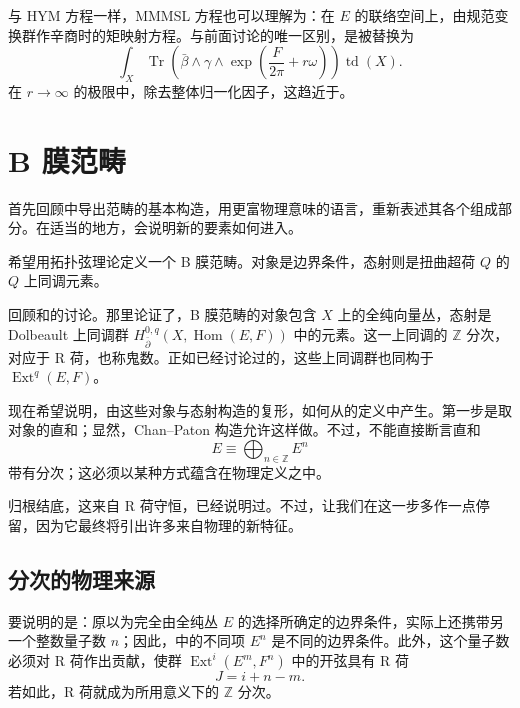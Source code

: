 与 HYM 方程一样，MMMSL 方程也可以理解为：在 $E$ 的联络空间上，由规范变换群作辛商时的矩映射方程。与前面讨论的唯一区别，是被替换为
\[
\int_X\operatorname{Tr}\!\left(
\bar\beta\wedge\gamma\wedge\exp\!\left(\frac{F}{2\pi}+r\omega\right)
\right)\operatorname{td}(X).
\]
在 $r\to\infty$ 的极限中，除去整体归一化因子，这趋近于。

\section{B 膜范畴}\label{sec:5.3}

首先回顾中导出范畴的基本构造，用更富物理意味的语言，重新表述其各个组成部分。在适当的地方，会说明新的要素如何进入。

希望用拓扑弦理论定义一个 B 膜范畴。对象是边界条件，态射则是扭曲超荷 $Q$ 的 $Q$ 上同调元素。

回顾和的讨论。那里论证了，B 膜范畴的对象包含 $X$ 上的全纯向量丛，态射是 Dolbeault 上同调群 $H_{\bar\partial}^{0,q}(X,\operatorname{Hom}(E,F))$ 中的元素。这一上同调的 $\mathbb{Z}$ 分次，对应于 R 荷，也称鬼数。正如已经讨论过的，这些上同调群也同构于 $\operatorname{Ext}^q(E,F)$。

现在希望说明，由这些对象与态射构造的复形，如何从的定义中产生。第一步是取对象的直和；显然，Chan--Paton 构造允许这样做。不过，不能直接断言直和
\begin{equation}\label{eq:5.40}
E\equiv\bigoplus_{n\in\mathbb{Z}}E^n
\end{equation}
带有分次；这必须以某种方式蕴含在物理定义之中。

归根结底，这来自 R 荷守恒，已经说明过。不过，让我们在这一步多作一点停留，因为它最终将引出许多来自物理的新特征。

\subsection{分次的物理来源}\label{sec:5.3.1}

要说明的是：原以为完全由全纯丛 $E$ 的选择所确定的边界条件，实际上还携带另一个整数量子数 $n$；因此，中的不同项 $E^n$ 是不同的边界条件。此外，这个量子数必须对 R 荷作出贡献，使群 $\operatorname{Ext}^i(E^m,F^n)$ 中的开弦具有 R 荷
\begin{equation}\label{eq:5.41}
J=i+n-m.
\end{equation}
若如此，R 荷就成为所用意义下的 $\mathbb{Z}$ 分次。

